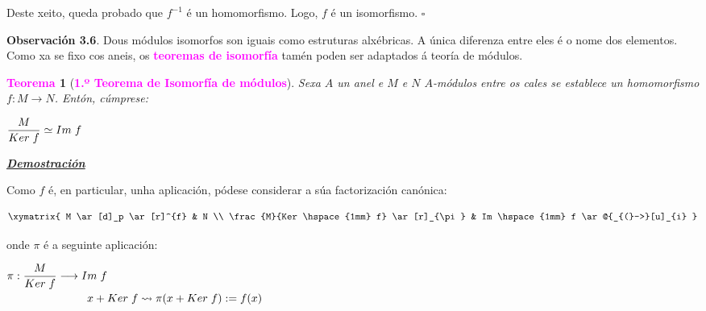 \documentclass[twoside]{report}
\newcommand{\magbf}[1]{\textcolor{magenta}{\textbf{#1}}} %
\theoremstyle{mystyle}
\newtheorem{theo}{\magbf{Teorema}}[chapter]
\newenvironment{theorem}
{\begin{mdframed}[linecolor = magenta,backgroundcolor = classicrose, linewidth = 2mm]\begin{theo}}
{\end{theo}\end{mdframed}}
\begin{document}
\noindent Deste xeito, queda probado que $f^{-1}$ é un homomorfismo. Logo, $f$ é un isomorfismo. $\square$\\

\vspace{3mm}

\noindent \textbf{Observación 3.6}. Dous módulos isomorfos son iguais como estruturas alxébricas. A única diferenza entre eles é o nome dos elementos.\\

\noindent Como xa se fixo cos aneis, os \magbf{teoremas de isomorfía} tamén poden ser adaptados á teoría de módulos.\\

\begin{theorem}[\magbf{1.º Teorema de Isomorfía de módulos}] \label{th3.1}
Sexa $A$ un anel e $M$ e $N$ $A$-módulos entre os cales se establece un homomorfismo $f: M \longrightarrow N$. Entón, cúmprese:
\begin{center}
    $\displaystyle \frac{M}{Ker \hspace{1mm} f} \simeq Im \hspace{1mm} f$
\end{center}
\end{theorem}

\vspace{2mm}

\noindent \textbf{\textit{\underline{Demostración}}}

\vspace{2mm}

\noindent Como $f$ é, en particular, unha aplicación, pódese considerar a súa factorización canónica:

$$
     \large \xymatrix{
        M \ar[d]_p \ar[r]^{f} & N \\
        \frac{M}{Ker \hspace{1mm} f} \ar[r]_{\pi} & Im \hspace{1mm} f \ar@{_{(}->}[u]_{i}
    }  
$$

onde $\pi$ é a seguinte aplicación:

\begin{center}
    $\pi: \displaystyle \frac{M}{Ker \hspace{1mm} f} \longrightarrow Im \hspace{1mm} f$\\
    \vspace{2mm}
    $\hspace{25mm} x + Ker \hspace{1mm} f \leadsto \pi(x + Ker \hspace{1mm} f) := f(x)$ 
\end{center}
\end{document}
